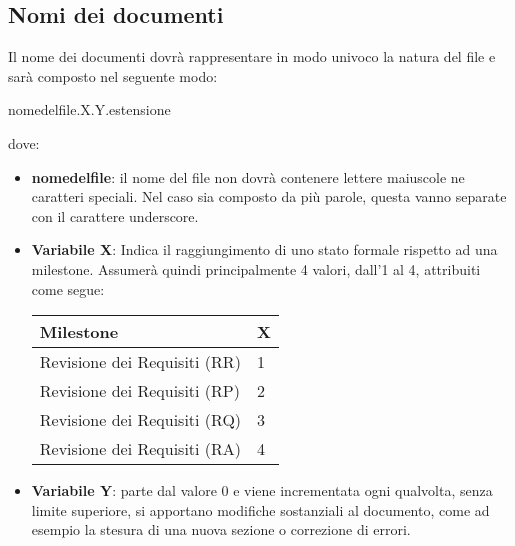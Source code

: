 \subsection{Nomi dei documenti}
Il nome dei documenti dovrà rappresentare in modo univoco la natura del file e sarà composto nel seguente modo:
\begin{center}
nome\textunderscore del\textunderscore file.X.Y.estensione
\end{center}
dove:
\begin{itemize}
\item \textbf{nome\textunderscore del\textunderscore file}: il nome del file non dovrà contenere lettere maiuscole ne caratteri speciali. Nel caso sia composto da più parole, questa vanno separate con il carattere underscore.
\item \textbf{Variabile X}: Indica il raggiungimento di uno stato formale rispetto ad una milestone. Assumerà quindi principalmente 4 valori, dall'1 al 4, attribuiti come segue:
\begin{center}
\begin{tabular}{l|l}
\toprule
Milestone & X\\
\midrule
Revisione dei Requisiti (RR) & 1\\
Revisione dei Requisiti (RP) & 2\\
Revisione dei Requisiti (RQ) & 3\\
Revisione dei Requisiti (RA) & 4\\
\bottomrule
\end{tabular}
\end{center}
\item \textbf{Variabile Y}: parte dal valore 0 e viene incrementata ogni qualvolta, senza limite superiore, si apportano modifiche sostanziali al documento, come ad esempio la stesura di una nuova sezione o correzione di errori.
\end{itemize}

